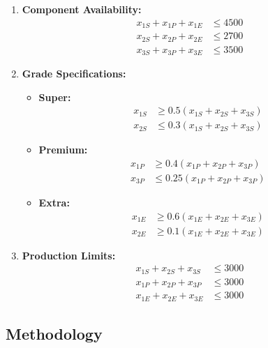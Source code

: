 \documentclass[8pt]{article}
\begin{document}
\begin{enumerate}
    \item \textbf{Component Availability:}
    \begin{align*}
    x_{1S} + x_{1P} + x_{1E} &\leq 4500 \\
    x_{2S} + x_{2P} + x_{2E} &\leq 2700 \\
    x_{3S} + x_{3P} + x_{3E} &\leq 3500
    \end{align*}
    
    \item \textbf{Grade Specifications:}
    \begin{itemize}
        \item \textbf{Super:}
        \begin{align*}
        x_{1S} &\geq 0.5(x_{1S} + x_{2S} + x_{3S}) \\
        x_{2S} &\leq 0.3(x_{1S} + x_{2S} + x_{3S})
        \end{align*}
        \item \textbf{Premium:}
        \begin{align*}
        x_{1P} &\geq 0.4(x_{1P} + x_{2P} + x_{3P}) \\
        x_{3P} &\leq 0.25(x_{1P} + x_{2P} + x_{3P})
        \end{align*}
        \item \textbf{Extra:}
        \begin{align*}
        x_{1E} &\geq 0.6(x_{1E} + x_{2E} + x_{3E}) \\
        x_{2E} &\geq 0.1(x_{1E} + x_{2E} + x_{3E})
        \end{align*}
    \end{itemize}
    
    \item \textbf{Production Limits:}
    \begin{align*}
    x_{1S} + x_{2S} + x_{3S} &\leq 3000 \\
    x_{1P} + x_{2P} + x_{3P} &\leq 3000 \\
    x_{1E} + x_{2E} + x_{3E} &\leq 3000
    \end{align*}
\end{enumerate}

\subsection*{Methodology}
\end{document}
